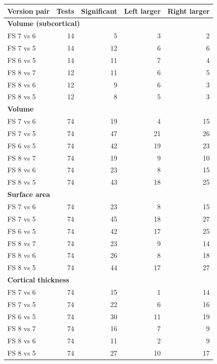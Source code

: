 \begin{tabular}{lrrrr}
\toprule
Version pair & Tests & Significant & Left larger & Right larger \\
\midrule\multicolumn{5}{l}{\textbf{Volume (subcortical)}} \\
FS 7 vs 6 & 14 & 5 & 3 & 2 \\
FS 7 vs 5 & 14 & 12 & 6 & 6 \\
FS 6 vs 5 & 14 & 11 & 7 & 4 \\
FS 8 vs 7 & 12 & 11 & 6 & 5 \\
FS 8 vs 6 & 12 & 9 & 6 & 3 \\
FS 8 vs 5 & 12 & 8 & 5 & 3 \\
\midrule\multicolumn{5}{l}{\textbf{Volume}} \\
FS 7 vs 6 & 74 & 19 & 4 & 15 \\
FS 7 vs 5 & 74 & 47 & 21 & 26 \\
FS 6 vs 5 & 74 & 42 & 19 & 23 \\
FS 8 vs 7 & 74 & 19 & 9 & 10 \\
FS 8 vs 6 & 74 & 23 & 8 & 15 \\
FS 8 vs 5 & 74 & 43 & 18 & 25 \\
\midrule\multicolumn{5}{l}{\textbf{Surface area}} \\
FS 7 vs 6 & 74 & 23 & 8 & 15 \\
FS 7 vs 5 & 74 & 45 & 18 & 27 \\
FS 6 vs 5 & 74 & 42 & 17 & 25 \\
FS 8 vs 7 & 74 & 23 & 9 & 14 \\
FS 8 vs 6 & 74 & 26 & 8 & 18 \\
FS 8 vs 5 & 74 & 44 & 17 & 27 \\
\midrule\multicolumn{5}{l}{\textbf{Cortical thickness}} \\
FS 7 vs 6 & 74 & 15 & 1 & 14 \\
FS 7 vs 5 & 74 & 22 & 6 & 16 \\
FS 6 vs 5 & 74 & 30 & 11 & 19 \\
FS 8 vs 7 & 74 & 16 & 7 & 9 \\
FS 8 vs 6 & 74 & 11 & 2 & 9 \\
FS 8 vs 5 & 74 & 27 & 10 & 17 \\
\bottomrule
\end{tabular}
